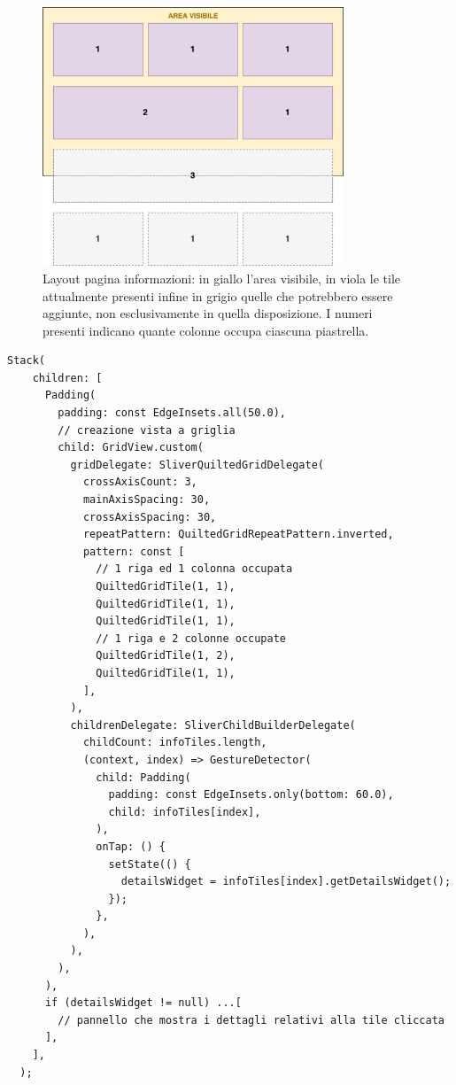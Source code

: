 \begin{figure}
  \centering
  \includegraphics[width=9cm]{img/totem/layout_gridview.png}
  \caption[Layout pagina informazioni]{Layout pagina informazioni: in giallo l'area visibile, in viola le tile attualmente presenti infine in grigio quelle che potrebbero essere aggiunte, non esclusivamente in quella disposizione. I numeri presenti indicano quante colonne occupa ciascuna piastrella.}
  \label{fig:infopageLayout}
\end{figure}

\begin{lstlisting}[style=FlutterStyle, caption={}, label={lst:infoPageCode}]
  Stack(
    children: [
      Padding(
        padding: const EdgeInsets.all(50.0),
        // creazione vista a griglia
        child: GridView.custom(
          gridDelegate: SliverQuiltedGridDelegate(
            crossAxisCount: 3,
            mainAxisSpacing: 30,
            crossAxisSpacing: 30,
            repeatPattern: QuiltedGridRepeatPattern.inverted,
            pattern: const [
              // 1 riga ed 1 colonna occupata
              QuiltedGridTile(1, 1),  
              QuiltedGridTile(1, 1),
              QuiltedGridTile(1, 1),
              // 1 riga e 2 colonne occupate
              QuiltedGridTile(1, 2),
              QuiltedGridTile(1, 1),
            ],
          ),
          childrenDelegate: SliverChildBuilderDelegate(
            childCount: infoTiles.length,
            (context, index) => GestureDetector(
              child: Padding(
                padding: const EdgeInsets.only(bottom: 60.0),
                child: infoTiles[index],
              ),
              onTap: () {
                setState(() {
                  detailsWidget = infoTiles[index].getDetailsWidget();
                });
              },
            ),
          ),
        ),
      ),
      if (detailsWidget != null) ...[
        // pannello che mostra i dettagli relativi alla tile cliccata
      ],
    ],
  );
\end{lstlisting}
